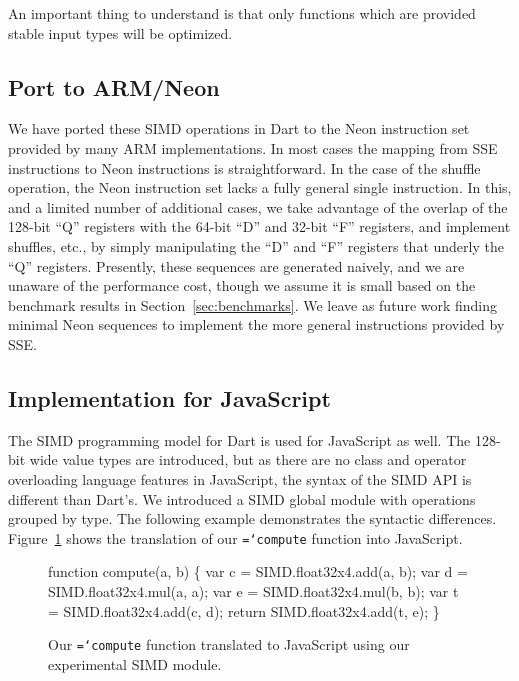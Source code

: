 \documentclass[preprint]{sigplanconf}
\newcommand{\ttt}[1]{{\texttt{\hyphenchar\font=`\-\relax #1}}}%
\begin{document}
An important thing to understand is that only functions which are provided
stable input types will be optimized.

\subsection{Port to ARM/Neon}

We have ported these SIMD operations in Dart to the Neon instruction set
provided by many ARM implementations.
%
In most cases the mapping from SSE instructions to Neon instructions is
straightforward.
%
In the case of the shuffle operation, the Neon instruction set lacks a fully
general single instruction.
%
In this, and a limited number of additional cases, we take advantage of the
overlap of the 128-bit ``Q'' registers with the 64-bit ``D'' and 32-bit ``F''
registers, and implement shuffles, etc., by simply manipulating the ``D'' and
``F'' registers that underly the ``Q'' registers.
%
Presently, these sequences are generated naively, and we are unaware of the
performance cost, though we assume it is small based on the benchmark results
in Section~\ref{sec:benchmarks}.
%
We leave as future work finding minimal Neon sequences to implement the more
general instructions provided by SSE.


\subsection{Implementation for JavaScript}
\label{JS}

The SIMD programming model for Dart is used for JavaScript as well. The 128-bit
wide value types are introduced, but as there are no class and operator
overloading language features in JavaScript, the syntax of the SIMD API is
different than Dart's. We introduced a SIMD global module with operations
grouped by type. The following example demonstrates the syntactic differences.
Figure~\ref{fig:jssimd} shows the translation of our \ttt{compute} function
into JavaScript.

\begin{figure}
\begin{small}
\begin{program}[style=tt, number=true]
fu\tab{}nction compute(a, b) \{
  var c = SIMD.float32x4.add(a, b);
  var d = SIMD.float32x4.mul(a, a);
  var e = SIMD.float32x4.mul(b, b);
  var t = SIMD.float32x4.add(c, d);
  return SIMD.float32x4.add(t, e);\untab{}
\}
\end{program}
\end{small}
\caption{Our \ttt{compute} function translated to JavaScript using our
experimental SIMD module.}
\label{fig:jssimd}
\end{figure}
\end{document}
